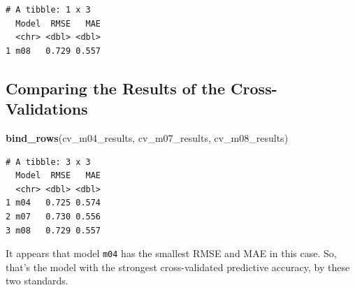 \documentclass[]{book}
\newenvironment{Shaded}{\begin{snugshade}}{\end{snugshade}}
\newcommand{\KeywordTok}[1]{\textcolor[rgb]{0.13,0.29,0.53}{\textbf{#1}}}
\newcommand{\NormalTok}[1]{#1}
\theoremstyle{definition}
\theoremstyle{definition}
\theoremstyle{definition}
\theoremstyle{remark}
\begin{document}
\begin{verbatim}
# A tibble: 1 x 3
  Model  RMSE   MAE
  <chr> <dbl> <dbl>
1 m08   0.729 0.557
\end{verbatim}

\subsection{Comparing the Results of the
Cross-Validations}\label{comparing-the-results-of-the-cross-validations}

\begin{Shaded}
\begin{Highlighting}[]
\KeywordTok{bind_rows}\NormalTok{(cv_m04_results, cv_m07_results, cv_m08_results)}
\end{Highlighting}
\end{Shaded}

\begin{verbatim}
# A tibble: 3 x 3
  Model  RMSE   MAE
  <chr> <dbl> <dbl>
1 m04   0.725 0.574
2 m07   0.730 0.556
3 m08   0.729 0.557
\end{verbatim}

It appears that model \texttt{m04} has the smallest RMSE and MAE in this
case. So, that's the model with the strongest cross-validated predictive
accuracy, by these two standards.


\end{document}
